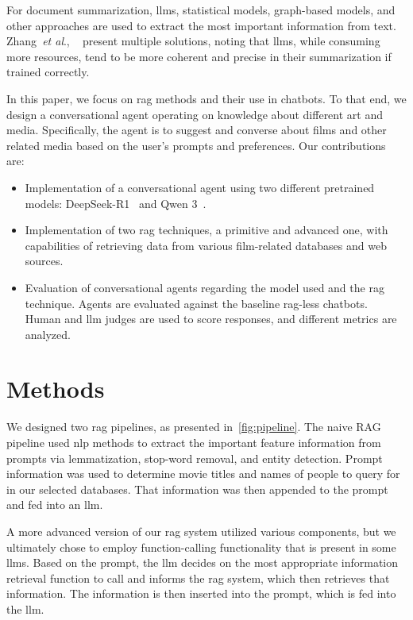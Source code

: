 \documentclass[fleqn,moreauthors,10pt]{ds_report}
\newcommand{\etal}{\textit{et al}., }
\begin{document}
For document summarization, \acp{llm}, statistical models, graph-based models, and other approaches are used to extract the most important information from text. Zhang~\etal~\cite{summarization} present multiple solutions, noting that \acp{llm}, while consuming more resources, tend to be more coherent and precise in their summarization if trained correctly.

In this paper, we focus on \ac{rag} methods and their use in chatbots. To that end, we design a conversational agent operating on knowledge about different art and media. Specifically, the agent is to suggest and converse about films and other related media based on the user’s prompts and preferences. Our contributions are:

\begin{itemize}
\setlength\itemsep{-0.3em}
    \item Implementation of a conversational agent using two different pretrained models: DeepSeek-R1~\cite{deepseek3} and Qwen 3~\cite{qwen3}.
    \item Implementation of two \ac{rag} techniques, a primitive and advanced one, with capabilities of retrieving data from various film-related databases and web sources.
    \item Evaluation of conversational agents regarding the model used and the \ac{rag} technique. Agents are evaluated against the baseline \ac{rag}-less chatbots. Human and \ac{llm} judges are used to score responses, and different metrics are analyzed.
\end{itemize}


\section*{Methods}

We designed two \ac{rag} pipelines, as presented in~\cref{fig:pipeline}. The naive RAG pipeline used \ac{nlp} methods to extract the important feature information from prompts via lemmatization, stop-word removal, and entity detection. Prompt information was used to determine movie titles and names of people to query for in our selected databases. That information was then appended to the prompt and fed into an \ac{llm}.

A more advanced version of our \ac{rag} system utilized various components, but we ultimately chose to employ function-calling functionality that is present in some \acp{llm}. Based on the prompt, the \ac{llm} decides on the most appropriate information retrieval function to call and informs the \ac{rag} system, which then retrieves that information. The information is then inserted into the prompt, which is fed into the \ac{llm}.
\end{document}
